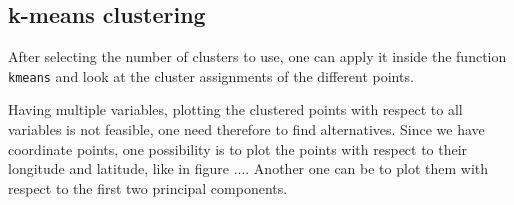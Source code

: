 \subsection{k-means clustering}\label{subsec:kmeans}

After selecting the number of clusters to use, one can apply it inside the function \texttt{kmeans} and look at the cluster assignments of the different points.

Having multiple variables, plotting the clustered points with respect to all variables is not feasible, one need therefore to find alternatives. Since we have coordinate points, one possibility is to plot the points with respect to their longitude and latitude, like in figure .... Another one can be to plot them with respect to the first two principal components.